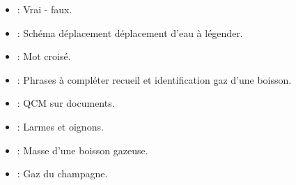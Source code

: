 \documentclass[12pt,a4paper]{article}
\begin{document}
\begin{myexos}
	\begin{itemize}
		\item {} : Vrai - faux.
		\item {} : Schéma déplacement déplacement d'eau à légender.
		\item {} : Mot croisé.
		\item {} : Phrases à compléter recueil et identification gaz d'une boisson.
		\item {} : QCM sur documents.
		\item {} : Larmes et oignons.
		\item {} : Masse d'une boisson gazeuse.
		\item {} : Gaz du champagne.
	\end{itemize}
\end{myexos}




\appendix

\end{document}
